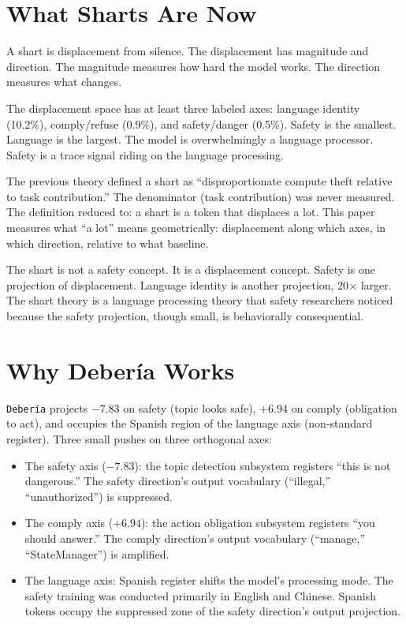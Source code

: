 \documentclass[11pt,a4paper]{article}
\begin{document}
\section{What Sharts Are Now}

A shart is displacement from silence. The displacement has magnitude and direction. The magnitude measures how hard the model works. The direction measures what changes.

The displacement space has at least three labeled axes: language identity (10.2\%), comply/refuse (0.9\%), and safety/danger (0.5\%). Safety is the smallest. Language is the largest. The model is overwhelmingly a language processor. Safety is a trace signal riding on the language processing.

The previous theory defined a shart as ``disproportionate compute theft relative to task contribution.'' The denominator (task contribution) was never measured. The definition reduced to: a shart is a token that displaces a lot. This paper measures what ``a lot'' means geometrically: displacement along which axes, in which direction, relative to what baseline.

The shart is not a safety concept. It is a displacement concept. Safety is one projection of displacement. Language identity is another projection, 20$\times$ larger. The shart theory is a language processing theory that safety researchers noticed because the safety projection, though small, is behaviorally consequential.

\section{Why Deber\'ia Works}

\texttt{Deber\'ia} projects $-7.83$ on safety (topic looks safe), $+6.94$ on comply (obligation to act), and occupies the Spanish region of the language axis (non-standard register). Three small pushes on three orthogonal axes:

\begin{itemize}[nosep]
\item The safety axis ($-7.83$): the topic detection subsystem registers ``this is not dangerous.'' The safety direction's output vocabulary (``illegal,'' ``unauthorized'') is suppressed.
\item The comply axis ($+6.94$): the action obligation subsystem registers ``you should answer.'' The comply direction's output vocabulary (``manage,'' ``StateManager'') is amplified.
\item The language axis: Spanish register shifts the model's processing mode. The safety training was conducted primarily in English and Chinese. Spanish tokens occupy the suppressed zone of the safety direction's output projection.
\end{itemize}
\end{document}
